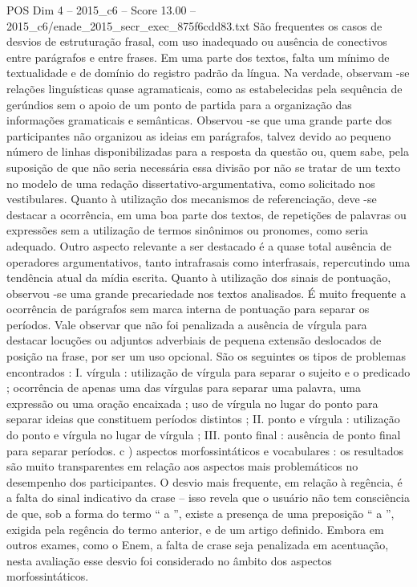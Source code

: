 \begin{textsample}{POS Dim 4 – 2015\_c6 – Score 13.00 – 2015\_c6/enade\_2015\_secr\_exec\_875f6cdd83.txt}
São frequentes os casos de desvios de estruturação frasal, com uso inadequado ou ausência de conectivos entre parágrafos e entre frases.
Em uma parte dos textos, falta um mínimo de textualidade e de domínio do registro padrão da língua.
Na verdade, observam -se relações linguísticas quase agramaticais, como as estabelecidas pela sequência de gerúndios sem o apoio de um ponto de partida para a organização das informações gramaticais e semânticas.
Observou -se que uma grande parte dos participantes não organizou as ideias em parágrafos, talvez devido ao pequeno número de linhas disponibilizadas para a resposta da questão ou, quem sabe, pela suposição de que não seria necessária essa divisão por não se tratar de um texto no modelo de uma redação dissertativo-argumentativa, como solicitado nos vestibulares.
Quanto à utilização dos mecanismos de referenciação, deve -se destacar a ocorrência, em uma boa parte dos textos, de repetições de palavras ou expressões sem a utilização de termos sinônimos ou pronomes, como seria adequado.
Outro aspecto relevante a ser destacado é a quase total ausência de operadores argumentativos, tanto intrafrasais como interfrasais, repercutindo uma tendência atual da mídia escrita.
Quanto à utilização dos sinais de pontuação, observou -se uma grande precariedade nos textos analisados.
É muito frequente a ocorrência de parágrafos sem marca interna de pontuação para separar os períodos.
Vale observar que não foi penalizada a ausência de vírgula para destacar locuções ou adjuntos adverbiais de pequena extensão deslocados de posição na frase, por ser um uso opcional.
São os seguintes os tipos de problemas encontrados : I. vírgula : utilização de vírgula para separar o sujeito e o predicado ; ocorrência de apenas uma das vírgulas para separar uma palavra, uma expressão ou uma oração encaixada ; uso de vírgula no lugar do ponto para separar ideias que constituem períodos distintos ; II. ponto e vírgula : utilização do ponto e vírgula no lugar de vírgula ; III. ponto final : ausência de ponto final para separar períodos. c ) aspectos morfossintáticos e vocabulares : os resultados são muito transparentes em relação aos aspectos mais problemáticos no desempenho dos participantes.
O desvio mais frequente, em relação à regência, é a falta do sinal indicativo da crase – isso revela que o usuário não tem consciência de que, sob a forma do termo “ a ”, existe a presença de uma preposição “ a ”, exigida pela regência do termo anterior, e de um artigo definido.
Embora em outros exames, como o Enem, a falta de crase seja penalizada em acentuação, nesta avaliação esse desvio foi considerado no âmbito dos aspectos morfossintáticos.

\end{textsample}
